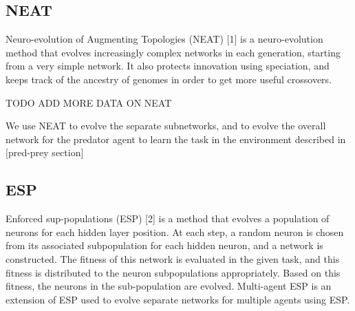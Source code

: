 \subsection{NEAT}
Neuro-evolution of Augmenting Topologies (NEAT) [1] is a neuro-evolution method that evolves increasingly complex networks in each generation, starting from a very simple network. It also protects innovation using speciation, and keeps track of the ancestry of genomes in order to get more useful crossovers.
   
TODO ADD MORE DATA ON NEAT 

We use NEAT to evolve the separate subnetworks, and to evolve the overall network for the predator agent to learn the task in the environment described in [pred-prey section] 

\subsection{ESP}
Enforced sup-populations (ESP) [2] is a method that evolves a population of neurons for each hidden layer position. At each step, a random neuron is chosen from its associated subpopulation for each hidden neuron, and a network is constructed. The fitness of this network is evaluated in the given task, and this fitness is distributed to the neuron subpopulations appropriately. Based on this fitness, the neurons in the sub-population are evolved.
Multi-agent ESP is an extension of ESP used to evolve separate networks for multiple agents using ESP. 

